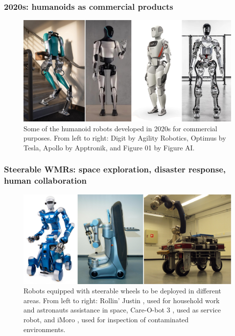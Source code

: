 \subsubsection{2020s: humanoids as commercial products}
\begin{figure}
    \centering
    \includegraphics[width=\textwidth]{figures/01-introduction/robots-in-2020.jpg}
    \caption{Some of the humanoid robots developed in 2020s for commercial
        purposes. From left to right:
        Digit by Agility Robotics, Optimus by Tesla, Apollo by Apptronik, and
        Figure 01 by Figure AI.
    }
    \label{fig:introduction:robots-in-2020}
\end{figure}

\subsubsection{Steerable WMRs: space exploration, disaster response, human collaboration}
\begin{figure}
    \centering
    \includegraphics[width=\textwidth]{figures/01-introduction/SWMRs-1.jpg}
    \caption{Robots equipped with steerable wheels to be deployed in different areas.
        From left to right: Rollin' Justin \cite{Fuchs2009RollinJustin}, used 
        for household work and astronauts assistance in space, 
        Care-O-bot 3 \cite{Graf2009Care-O-bot3}, used as service robot, and
        iMoro \cite{Oftadeh2013iMoro}, used for inspection of contaminated
        environments.}
    \label{fig:introduction:SWMRs-1}
\end{figure}


